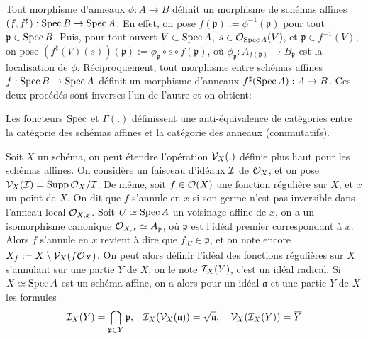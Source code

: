 Tout morphisme d'anneaux $\phi:A\rightarrow B$ définit un morphisme de schémas affines $(f,f^\sharp):\operatorname{Spec} B\rightarrow\operatorname{Spec} A$. En effet, on pose $f(\mathfrak{p}):=\phi^{-1}(\mathfrak{p})$ pour tout $\mathfrak{p}\in \operatorname{Spec} B$. Puis, pour tout ouvert $V\subset \operatorname{Spec} A$, $s\in\mathcal{O}_{\operatorname{Spec} A}(V)$, et $\mathfrak{p}\in f^{-1}(V)$, on pose $(f^\sharp(V)(s))(\mathfrak{p}):=\phi_{\mathfrak{p}}\circ s \circ f(\mathfrak{p})$, où $\phi_{\mathfrak{p}}:A_{f(\mathfrak{p})}\rightarrow B_{\mathfrak{p}}$ est la localisation de $\phi$.
Réciproquement, tout morphisme entre schémas affines $f:\operatorname{Spec} B\rightarrow \operatorname{Spec} A$ définit un morphisme d'anneaux $f^\sharp(\operatorname{Spec} A):A\rightarrow B$. Ces deux procédés sont inverses l'un de l'autre et on obtient:


\begin{prop}\label{EqCat}
Les foncteurs $\operatorname{Spec}$ et $\Gamma(.)$ définissent une anti-équivalence de catégories entre la catégorie des schémas affines et la catégorie des anneaux (commutatifs).
\end{prop}

Soit $X$ un schéma, on peut étendre l'opération $\mathcal{V}_X(.)$ définie plus haut pour les schémas affines. On considère un faisceau d'idéaux $\mathcal{I}$ de $\mathcal{O}_X$, et on pose $\mathcal{V}_X(\mathcal{I})=\operatorname{Supp} \mathcal{O}_X/\mathcal{I}$. De même, soit $f\in \mathcal{O}(X)$ une fonction régulière sur $X$, et $x$ un point de $X$. On dit que $f$ s'annule en $x$ si son germe n'est pas inversible dans l'anneau local $\mathcal{O}_{X,x}$. Soit $U\simeq\operatorname{Spec} A$ un voisinage affine de $x$, on a un isomorphisme canonique $\mathcal{O}_{X,x}\simeq A_\mathfrak{p}$, où $\mathfrak{p}$ est l'idéal premier correspondant à $x$. Alors $f$ s'annule en $x$ revient à dire que $f_{|U}\in \mathfrak{p}$, et on note encore $X_f:=X\setminus \mathcal{V}_X(f\mathcal{O}_X)$. On peut alors définir l'idéal des fonctions régulières sur $X$ s'annulant sur une partie $Y$ de $X$, on le note $\mathcal{I}_X(Y)$, c'est un idéal radical. Si $X\simeq\operatorname{Spec} A$ est un schéma affine, on a alors pour un idéal $\mathfrak{a}$ et une partie $Y$ de $X$ les formules
$$\mathcal{I}_X(Y)=\bigcap_{\mathfrak{p}\in Y}\mathfrak{p},\,\,\,\,\, \mathcal{I}_X(\mathcal{V}_X(\mathfrak{a}))=\sqrt{\mathfrak{a}},\,\,\,\,\,\,\mathcal{V}_X(\mathcal{I}_X(Y))=\overline{Y}$$

